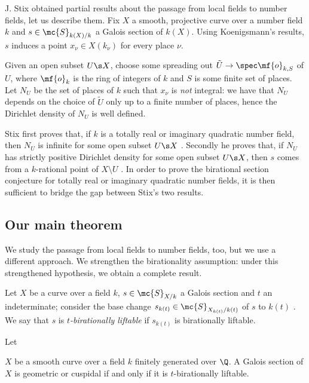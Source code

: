 J. Stix \cite{sti15} obtained partial results about the passage from local fields to number fields, let us describe them. Fix $X$ a smooth, projective curve over a number field $k$ and $s\in\mc{S}_{k(X)/k}$ a Galois section of $k(X)$. Using Koenigsmann's results, $s$ induces a point $x_{\nu}\in X(k_{\nu})$ for every place $\nu$.

Given an open subset $U\s X$, choose some spreading out $\tilde{U}\to\spec \mf{o}_{k,S}$ of $U$, where $\mf{o}_{k}$ is the ring of integers of $k$ and $S$ is some finite set of places. Let $N_{U}$ be the set of places of $k$ such that $x_{\nu}$ is \emph{not} integral: we have that $N_{U}$ depends on the choice of $\tilde{U}$ only up to a finite number of places, hence the Dirichlet density of $N_{U}$ is well defined.

Stix first proves that, if $k$ is a totally real or imaginary quadratic number field, then $N_{U}$ is infinite for some open subset $U\s X$ \cite[Theorem A]{sti15}. Secondly he proves that, if $N_{U}$ has strictly positive Dirichlet density for some open subset $U\s X$, then $s$ comes from a $k$-rational point of $X\setminus U$ \cite[Theorem B]{sti15}. In order to prove the birational section conjecture for totally real or imaginary quadratic number fields, it is then sufficient to bridge the gap between Stix's two results.

\subsection{Our main theorem}

We study the passage from local fields to number fields, too, but we use a different approach. We strengthen the birationality assumption: under this strengthened hypothesis, we obtain a complete result.

\begin{definition*}
\notready
    Let $X$ be a curve over a field $k$, $s\in\mc{S}_{X/k}$ a Galois section and $t$ an indeterminate; consider the base change $s_{k(t)}\in\mc{S}_{X_{k(t)}/k(t)}$ of $s$ to $k(t)$ \cite[Definition 27]{sti13}. We say that $s$ is \emph{$t$-birationally liftable} if $s_{k(t)}$ is birationally liftable.
\end{definition*}

\begin{TA}
\notready
    \hypertarget{TA}{Let} $X$ be a smooth curve over a field $k$ finitely generated over $\Q$. A Galois section of $X$ is geometric or cuspidal if and only if it is $t$-birationally liftable.
\end{TA}

